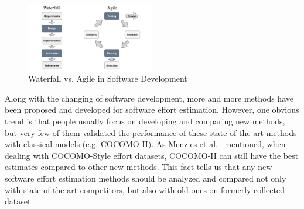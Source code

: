 \documentclass[sigconf,review]{acmart}
\begin{document}
\begin{figure}
\centerline{\includegraphics[width=0.5\textwidth]{water_grey.pdf}}
\caption{Waterfall vs. Agile in Software Development}    
\label{fig:water}
\end{figure}



Along with the changing of software development, more and more methods have been proposed and developed for software effort estimation. However,  one obvious trend is that people usually focus on developing and comparing new methods, but very few of them validated the performance of these state-of-the-art methods with classical models (e.g. COCOMO-II). As Menzies et al.~\cite{MenziesNeg:2017} mentioned, when dealing with COCOMO-Style effort datasets, COCOMO-II can still have the best estimates compared to other new methods. This fact tells us that any new software effort estimation methods should be analyzed and compared not only with state-of-the-art competitors, but also with old ones on formerly collected dataset. 


\end{document}

